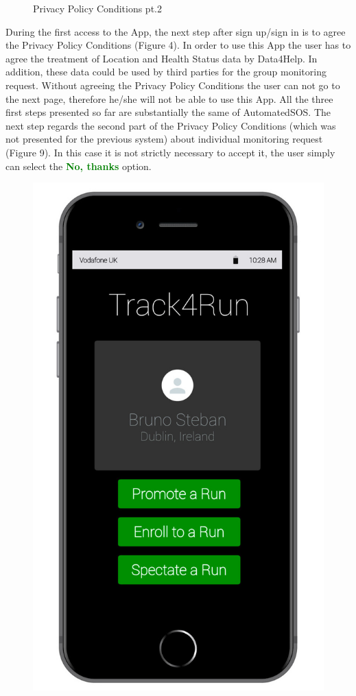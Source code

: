 \begin{enumerate}
\begin{figure}[H]
\begin{center}
\begin{minipage}[c]{.40\textwidth}
	\caption{Privacy Policy Conditions pt.2}
        \end{minipage}
      \end{center}
\end{figure}
During the first access to the App, the next step after sign up/sign in is to agree the Privacy Policy Conditions (Figure 4). In order to use this App the user has to agree the treatment of Location and Health Status data by Data4Help. In addition, these data could be used by third parties for the group monitoring request. Without agreeing the Privacy Policy Conditions the user can not go to the next page, therefore he/she will not be able to use this App. All the three first steps presented so far are substantially the same of AutomatedSOS. The next step regards the second part of the Privacy Policy Conditions (which was not presented for the previous system) about individual monitoring request (Figure 9).  In this case it is not strictly necessary to accept it, the user simply can select the {\textcolor{Green}{\textbf{No, thanks}}} option.
\clearpage
\begin{figure}[H]
\begin{center}
        \begin{minipage}[c]{.40\textwidth}
        \centering
          \includegraphics[height=14 cm]{Images/Mockups/Track4RunMockup5.jpg}

\end{minipage}
\end{center}
\end{figure}
\end{enumerate}
